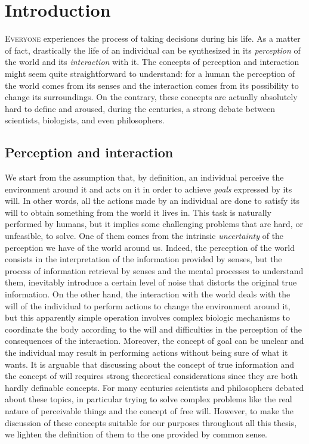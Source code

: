\chapter{Introduction}\label{C:intro}
\lettrine{E}{veryone} experiences the process of taking decisions during his life. As a matter of fact, drastically the life of an individual can be synthesized in its \textit{perception} of the world and its \textit{interaction} with it. The concepts of perception and interaction might seem quite straightforward to understand: for a human the perception of the world comes from its senses and the interaction comes from its possibility to change its surroundings. On the contrary, these concepts are actually absolutely hard to define and aroused, during the centuries, a strong debate between scientists, biologists, and even philosophers.

\section{Perception and interaction}
We start from the assumption that, by definition, an individual perceive the environment around it and acts on it in order to achieve \textit{goals} expressed by its will. In other words, all the actions made by an individual are done to satisfy its will to obtain something from the world it lives in. This task is naturally performed by humans, but it implies some challenging problems that are hard, or unfeasible, to solve. One of them comes from the intrinsic \textit{uncertainty} of the perception we have of the world around us. Indeed, the perception of the world consists in the interpretation of the information provided by senses, but the process of information retrieval by senses and the mental processes to understand them, inevitably introduce a certain level of noise that distorts the original true information. On the other hand, the interaction with the world deals with the will of the individual to perform actions to change the environment around it, but this apparently simple operation involves complex biologic mechanisms to coordinate the body according to the will and difficulties in the perception of the consequences of the interaction. Moreover, the concept of goal can be unclear and the individual may result in performing actions without being sure of what it wants.
It is arguable that discussing about the concept of true information and the concept of will requires strong theoretical considerations since they are both hardly definable concepts. For many centuries scientists and philosophers debated about these topics, in particular trying to solve complex problems like the real nature of perceivable things and the concept of free will. However, to make the discussion of these concepts suitable for our purposes throughout all this thesis, we lighten the definition of them to the one provided by common sense.

